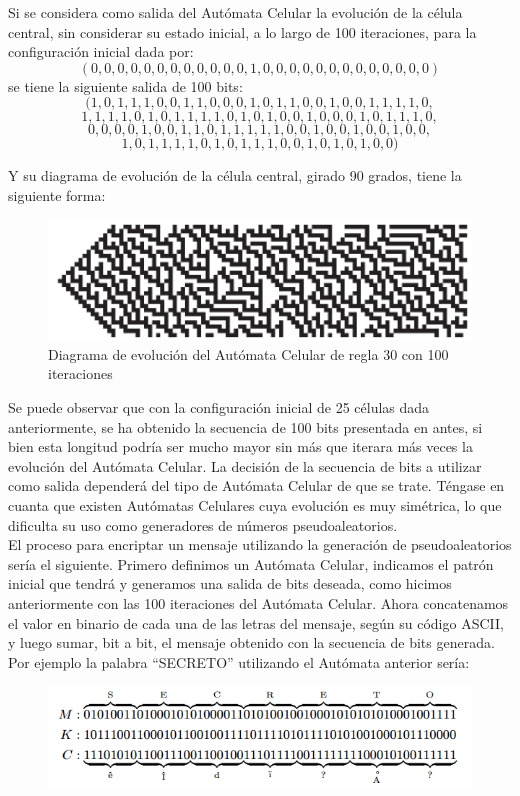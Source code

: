 Si se considera como salida del Autómata Celular la evolución de la célula central, sin considerar su estado inicial, a lo largo de 100 iteraciones, para la configuración inicial dada por:
$$(0,0,0,0,0,0,0,0,0,0,0,0,1,0,0,0,0,0,0,0,0,0,0,0,0,0)$$
se tiene la siguiente salida de 100 bits:
$$(1,0,1,1,1,0,0,1,1,0,0,0,1,0,1,1,0,0,1,0,0,1,1,1,1,0,$$
$$1,1,1,1,0,1,0,1,1,1,1,0,1,0,1,0,0,1,0,0,0,1,0,1,1,1,0,$$
$$0,0,0,0,1,0,0,1,1,0,1,1,1,1,1,0,0,1,0,0,1,0,0,1,0,0,$$
$$1,0,1,1,1,1,0,1,0,1,1,1,0,0,1,0,1,0,1,0,0)$$

Y su diagrama de evolución de la célula central, girado 90 grados, tiene la siguiente forma:

\begin{figure}[H]
\centering
\includegraphics[scale=0.7]{imagenes/regla_30_100.png}
\caption{Diagrama de evolución del Autómata Celular de regla 30 con 100 iteraciones}
\end{figure}

Se puede observar que con la configuración inicial de 25 células dada anteriormente, se ha obtenido la secuencia de 100 bits presentada en antes, si bien esta longitud podría ser mucho mayor sin más que iterara más veces la evolución del Autómata Celular. La decisión de la secuencia de bits a utilizar como salida dependerá del tipo de Autómata Celular de que se trate. Téngase en cuanta que existen Autómatas Celulares cuya evolución es muy simétrica, lo que dificulta su uso como generadores de números pseudoaleatorios.\\

El proceso para encriptar un mensaje utilizando la generación de pseudoaleatorios sería el siguiente. Primero definimos un Autómata Celular, indicamos el patrón inicial que tendrá y generamos una salida de bits deseada, como hicimos anteriormente con las 100 iteraciones del Autómata Celular. Ahora concatenamos el valor en binario de cada una de las letras del mensaje, según su código ASCII, y luego sumar, bit a bit, el mensaje obtenido con la secuencia de bits generada. Por ejemplo la palabra ``SECRETO'' utilizando el Autómata anterior sería:

\begin{figure}[H]
\centering
\includegraphics[scale=0.7]{imagenes/secreto.png}
\end{figure}

